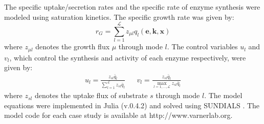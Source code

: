\documentclass[10pt,twocolumn,twoside,final]{IEEEtran}
\begin{document}
The specific uptake/secretion rates and the specific rate of enzyme synthesis were modeled using saturation kinetics.
The specific growth rate was given by:
\begin{equation}
	r_{G}  = \sum_{l = 1}^{\mathcal{L}}z_{\mu l}q_{l}\left(\mathbf{e},\mathbf{k},\mathbf{x}\right)
\end{equation}
where $z_{\mu l}$ denotes the growth flux $\mu$ through mode $l$.
The control variables $u_{l}$ and $v_{l}$, which control the synthesis and activity of each enzyme respectively, were given by:
\begin{align*}
	u_{l}  = \frac{z_{sl}\bar{q}_{l}}{\sum\limits_{l = 1}^{\mathcal{L}}z_{sl}\bar{q}_{l}} && v_{l} = \frac{z_{sl}\bar{q}_{l}}{\max\limits_{l=1,\hdots,\mathcal{L}}z_{sl}\bar{q}_{l}}
\end{align*}
where $z_{sl}$ denotes the uptake flux of substrate $s$ through mode $l$.
The model equations were implemented in Julia (v.0.4.2) \cite{Julia} and solved using SUNDIALS \cite{Sundials}.
The model code for each case study is available at http://www.varnerlab.org.


\end{document}
